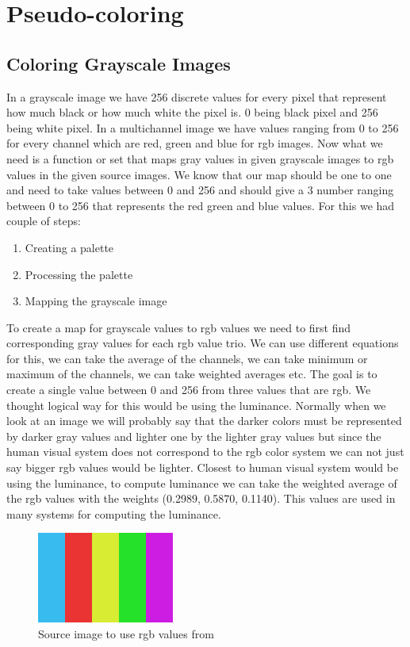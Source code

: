 \documentclass[conference]{IEEEtran}
\begin{document}
\section{Pseudo-coloring}
\subsection{Coloring Grayscale Images}
In a grayscale image we have 256 discrete values for every pixel that represent how much black or how much white the pixel is. 0 being black pixel and 256 being white pixel. In a multichannel image we have values ranging from 0 to 256 for every channel which are red, green and blue for rgb images. Now what we need is a function or set that maps gray values in given grayscale images to rgb values in the given source images. We know that our map should be one to one and need to take values between 0 and 256 and should give a 3 number ranging between 0 to 256 that represents the red green and blue values. For this we had couple of steps:
\begin{enumerate}
    \item Creating a palette
    \item Processing the palette
    \item Mapping the grayscale image
\end{enumerate}

To create a map for grayscale values to rgb values we need to first find corresponding gray values for each rgb value trio. We can use different equations for this, we can take the average of the channels, we can take minimum or maximum of the channels, we can take weighted averages etc. The goal is to create a single value between 0 and 256 from three values that are rgb. We thought logical way for this would be using the luminance. Normally when we look at an image we will probably say that the darker colors must be represented by darker gray values and lighter one by the lighter gray values but since the human visual system does not correspond to the rgb color system we can not just say bigger rgb values would be lighter. Closest to human visual system would be using the luminance, to compute luminance we can take the weighted average of the rgb values with the weights (0.2989, 0.5870, 0.1140). This values are used in many systems for computing the luminance. 

\begin{figure}[H]
    \centering
    \includegraphics[width=0.4\textwidth]{resources/4_source.png}
    \caption{Source image to use rgb values from}
    \label{fig:image_4_source}
\end{figure}
\end{document}
